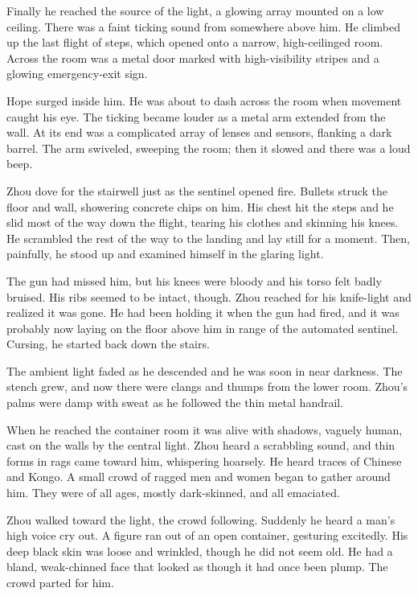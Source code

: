 \documentclass[10pt,b5paper]{article}
\begin{document}
Finally he reached the source of the light, a glowing array
mounted on a low ceiling. There was a faint ticking sound from
somewhere above him. He climbed up the last flight of steps,
which opened onto a narrow, high-ceilinged room. Across the room
was a metal door marked with high-visibility stripes and a glowing
emergency-exit sign.

Hope surged inside him. He was about to dash across the room when
movement caught his eye. The ticking became louder as a metal
arm extended from the wall. At its end was a complicated array
of lenses and sensors, flanking a dark barrel. The arm swiveled,
sweeping the room; then it slowed and there was a loud beep.

Zhou dove for the stairwell just as the sentinel opened fire. Bullets
struck the floor and wall, showering concrete chips on him. His
chest hit the steps and he slid most of the way down the flight,
tearing his clothes and skinning his knees. He scrambled the rest of
the way to the landing and lay still for a moment. Then, painfully,
he stood up and examined himself in the glaring light.

The gun had missed him, but his knees were bloody and his torso
felt badly bruised. His ribs seemed to be intact, though. Zhou
reached for his knife-light and realized it was gone. He had been
holding it when the gun had fired, and it was probably now laying
on the floor above him in range of the automated sentinel. Cursing,
he started back down the stairs.

The ambient light faded as he descended and he was soon in near
darkness. The stench grew, and now there were clangs and thumps from
the lower room. Zhou's palms were damp with sweat as he followed
the thin metal handrail.

When he reached the container room it was alive with shadows,
vaguely human, cast on the walls by the central light. Zhou heard a
scrabbling sound, and thin forms in rags came toward him, whispering
hoarsely. He heard traces of Chinese and Kongo. A small crowd of
ragged men and women began to gather around him. They were of all
ages, mostly dark-skinned, and all emaciated.

Zhou walked toward the light, the crowd following. Suddenly he heard
a man's high voice cry out. A figure ran out of an open container,
gesturing excitedly. His deep black skin was loose and wrinkled,
though he did not seem old. He had a bland, weak-chinned face that
looked as though it had once been plump. The crowd parted for him.
\end{document}

